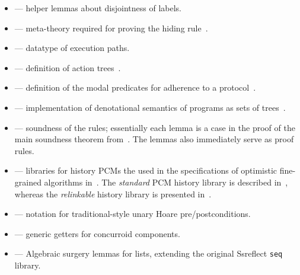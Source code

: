 \begin{itemize}
\item {} ---            helper lemmas about disjointness of labels.

\item {} --- meta-theory required for proving the hiding
  rule~\cite[Appendix~F.2]{Nanevski-al:ESOP14}.

\item {} --- datatype of execution paths.

\item {} --- definition of action trees~\cite[Appendices
  F.1, F.3 and F.4]{Nanevski-al:ESOP14}.

\item {} --- definition of the modal predicates for
  adherence to a protocol~\cite[Appendices~F.5 and~F.7]{Nanevski-al:ESOP14}.

\item {} --- implementation of denotational semantics of
  programs as sets of trees~\cite[Appendix F.6]{Nanevski-al:ESOP14}. %

\item {} --- soundness of the rules; essentially each
  lemma is a case in the proof of the main soundness theorem
  from~\cite[Appendix F.7]{Nanevski-al:ESOP14}. The lemmas also
  immediately serve as proof rules. %

\item {} ---  libraries for history PCMs the used in the specifications of
optimistic fine-grained algorithms
in~\cite{Sergey-al:ESOP15,Sergey-al:OOPSLA16,
Delbianco-al:ECOOP17}. The {\it standard} PCM history library is
described in~\cite{Sergey-al:ESOP15}, whereas the {\it relinkable}
history library is presented in~\cite{Delbianco-al:ECOOP17}.

\item {} --- notation for traditional-style unary Hoare
  pre/postconditions. %

\item {} --- generic getters for concurroid components.%

 \item {} --- Algebraic surgery lemmas for lists,
 extending the original Ssreflect \texttt{seq} library.

\end{itemize}

